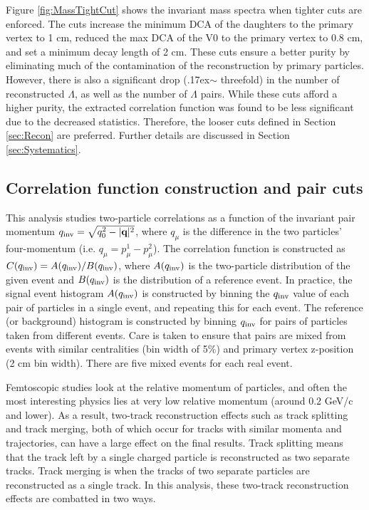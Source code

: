 Figure \ref{fig:MassTightCut} shows the invariant mass spectra when tighter cuts are enforced.  The cuts increase the minimum DCA of the daughters to the primary vertex to 1 cm, reduced the max DCA of the V0 to the primary vertex to 0.8 cm, and set a minimum decay length of 2 cm.  These cuts ensure a better purity by eliminating much of the contamination of the reconstruction by primary particles.  However, there is also a significant drop ({\raise.17ex\hbox{$\scriptstyle\mathtt{\sim}$}} threefold) in the number of reconstructed $\Lambda$, as well as the number of $\Lambda$ pairs.  While these cuts afford a higher purity, the extracted correlation function was found to be less significant due to the decreased statistics.  Therefore, the looser cuts defined in Section \ref{sec:Recon} are preferred.  Further details are discussed in Section \ref{sec:Systematics}.

\subsection{Correlation function construction and pair cuts}
\label{sec:CFconstruct}

This analysis studies two-particle correlations as a function of the invariant pair momentum $q_{\rm inv} = \sqrt{q^2_0 - |\textbf{q}|^2}$, where $q_\mu$ is the difference in the two particles' four-momentum (i.e. $q_\mu = p^1_\mu - p^2_\mu$).  The correlation function is constructed as $C(q_{\rm inv}) = A(q_{\rm inv})/B(q_{\rm inv})$, where $A(q_{\rm inv})$ is the two-particle distribution of the given event and $B(q_{\rm inv})$ is the distribution of a reference event.  In practice, the signal event histogram $A(q_{\rm inv})$ is constructed by binning the $q_{\rm inv}$ value of each pair of particles in a single event, and repeating this for each event.  The reference (or background) histogram is constructed by binning $q_{\rm inv}$ for pairs of particles taken from different events.  Care is taken to ensure that pairs are mixed from events with similar centralities (bin width of 5\%) and primary vertex z-position (2 cm bin width).  There are five mixed events for each real event.

Femtoscopic studies look at the relative momentum of particles, and often the most interesting physics lies at very low relative momentum (around 0.2 GeV/c and lower).  As a result, two-track reconstruction effects such as track splitting and track merging, both of which occur for tracks with similar momenta and trajectories, can have a large effect on the final results.  Track splitting means that the track left by a single charged particle is reconstructed as two separate tracks. Track merging is when the tracks of two separate particles are reconstructed as a single track.  In this analysis, these two-track reconstruction effects are combatted in two ways.  

